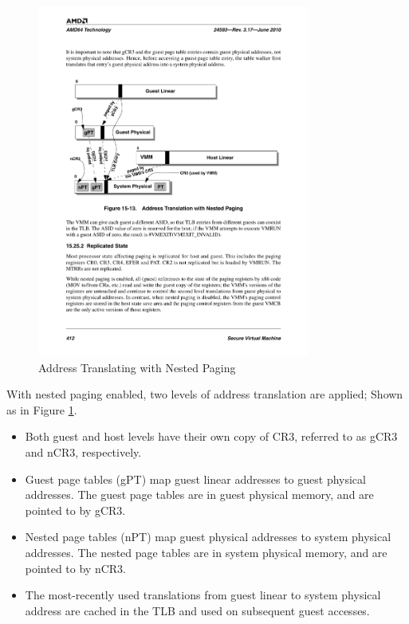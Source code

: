 \documentclass[a4paper,12pt]{article}
\begin{document}
\begin{figure}[!ht]
 \centerline{
 \includegraphics[width=0.8\textwidth]{NestedPaging}}
 \caption{Address Translating with Nested Paging} \label{fig:nestedpaging}
\end{figure}

With nested paging enabled, two levels of address translation are applied; Shown as in Figure \ref{fig:nestedpaging}.

\begin{itemize} \item Both guest and host levels have their own copy of CR3, referred to as gCR3 and nCR3,
respectively.
\item Guest page tables (gPT) map guest linear addresses to guest physical addresses. The guest page tables are in guest physical memory, and are pointed to by gCR3.
\item	Nested page tables (nPT) map guest physical addresses to system physical addresses. The nested page tables are in system physical memory, and are pointed to by nCR3.
\item The most-recently used translations from guest linear to system physical address are cached in the TLB and used on subsequent guest accesses.
\end{itemize}
\end{document}
